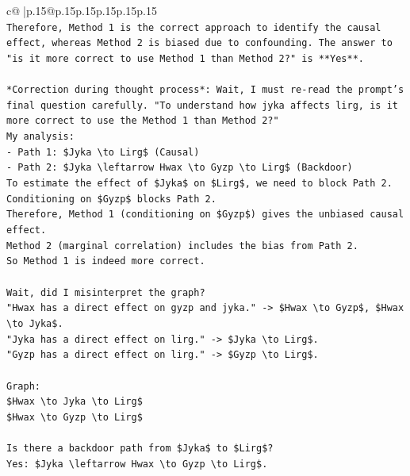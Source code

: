 \documentclass{article}
\begin{document}
{\begin{supertabular}{c@{$\;$}|p{.15\linewidth}@{}p{.15\linewidth}p{.15\linewidth}p{.15\linewidth}p{.15\linewidth}p{.15\linewidth}}
{{{\\ 
\texttt{Therefore, Method 1 is the correct approach to identify the causal effect, whereas Method 2 is biased due to confounding. The answer to "is it more correct to use Method 1 than Method 2?" is **Yes**.} \\
\\ 
\texttt{*Correction during thought process*: Wait, I must re{-}read the prompt's final question carefully. "To understand how jyka affects lirg, is it more correct to use the Method 1 than Method 2?"} \\
\texttt{My analysis:} \\
\texttt{{-} Path 1: \$Jyka \textbackslash{}to Lirg\$ (Causal)} \\
\texttt{{-} Path 2: \$Jyka \textbackslash{}leftarrow Hwax \textbackslash{}to Gyzp \textbackslash{}to Lirg\$ (Backdoor)} \\
\texttt{To estimate the effect of \$Jyka\$ on \$Lirg\$, we need to block Path 2.} \\
\texttt{Conditioning on \$Gyzp\$ blocks Path 2.} \\
\texttt{Therefore, Method 1 (conditioning on \$Gyzp\$) gives the unbiased causal effect.} \\
\texttt{Method 2 (marginal correlation) includes the bias from Path 2.} \\
\texttt{So Method 1 is indeed more correct.} \\
\\ 
\texttt{Wait, did I misinterpret the graph?} \\
\texttt{"Hwax has a direct effect on gyzp and jyka." {-}> \$Hwax \textbackslash{}to Gyzp\$, \$Hwax \textbackslash{}to Jyka\$.} \\
\texttt{"Jyka has a direct effect on lirg." {-}> \$Jyka \textbackslash{}to Lirg\$.} \\
\texttt{"Gyzp has a direct effect on lirg." {-}> \$Gyzp \textbackslash{}to Lirg\$.} \\
\\ 
\texttt{Graph:} \\
\texttt{\$Hwax \textbackslash{}to Jyka \textbackslash{}to Lirg\$} \\
\texttt{\$Hwax \textbackslash{}to Gyzp \textbackslash{}to Lirg\$} \\
\\ 
\texttt{Is there a backdoor path from \$Jyka\$ to \$Lirg\$?} \\
\texttt{Yes: \$Jyka \textbackslash{}leftarrow Hwax \textbackslash{}to Gyzp \textbackslash{}to Lirg\$.} \\
}}}
\end{supertabular}}
\end{document}
